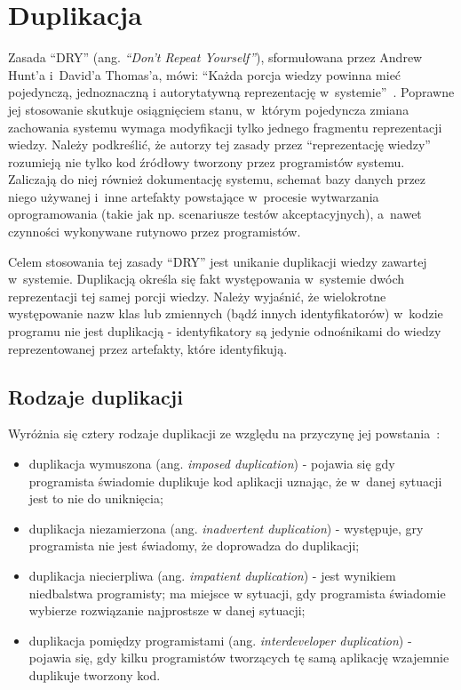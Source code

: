 \chapter{Duplikacja} \label{chap:duplication}

Zasada ``DRY'' (ang. \emph{``Don't Repeat Yourself''}), sformułowana przez Andrew Hunt'a i~David'a Thomas'a, mówi: ``Każda porcja wiedzy powinna mieć pojedynczą, jednoznaczną i autorytatywną reprezentację w~systemie''~\cite{prag_prog:dupl}.
Poprawne jej stosowanie skutkuje osiągnięciem stanu, w~którym pojedyncza zmiana zachowania systemu wymaga modyfikacji tylko jednego fragmentu reprezentacji wiedzy.
Należy podkreślić, że autorzy tej zasady przez ``reprezentację wiedzy'' rozumieją nie tylko kod źródłowy tworzony przez programistów systemu.
Zaliczają do niej również dokumentację systemu, schemat bazy danych przez niego używanej i~inne artefakty powstające w~procesie wytwarzania oprogramowania (takie jak np. scenariusze testów akceptacyjnych), a~nawet czynności wykonywane rutynowo przez programistów.

Celem stosowania tej zasady ``DRY'' jest unikanie duplikacji wiedzy zawartej w~systemie.
Duplikacją określa się fakt występowania w~systemie dwóch reprezentacji tej samej porcji wiedzy.
Należy wyjaśnić, że wielokrotne występowanie nazw klas lub zmiennych (bądź innych identyfikatorów) w~kodzie programu nie jest duplikacją - identyfikatory są jedynie odnośnikami do wiedzy reprezentowanej przez artefakty, które identyfikują.



\section{Rodzaje duplikacji} \label{sec:dupl_kinds}

Wyróżnia się cztery rodzaje duplikacji ze względu na przyczynę jej powstania~\cite{prag_prog:dupl}:

\begin{itemize}
 \item duplikacja wymuszona (ang. \emph{imposed duplication}) - pojawia się gdy programista świadomie duplikuje kod aplikacji uznając, że w~danej sytuacji jest to nie do uniknięcia;
 \item duplikacja niezamierzona (ang. \emph{inadvertent duplication}) - występuje, gry programista nie jest świadomy, że doprowadza do duplikacji;
 \item duplikacja niecierpliwa (ang. \emph{impatient duplication}) - jest wynikiem niedbalstwa programisty; ma miejsce w sytuacji, gdy programista świadomie wybierze rozwiązanie najprostsze w danej sytuacji;
 \item duplikacja pomiędzy programistami (ang. \emph{interdeveloper duplication}) - pojawia się, gdy kilku programistów tworzących tę samą aplikację wzajemnie duplikuje tworzony kod.
\end{itemize}

